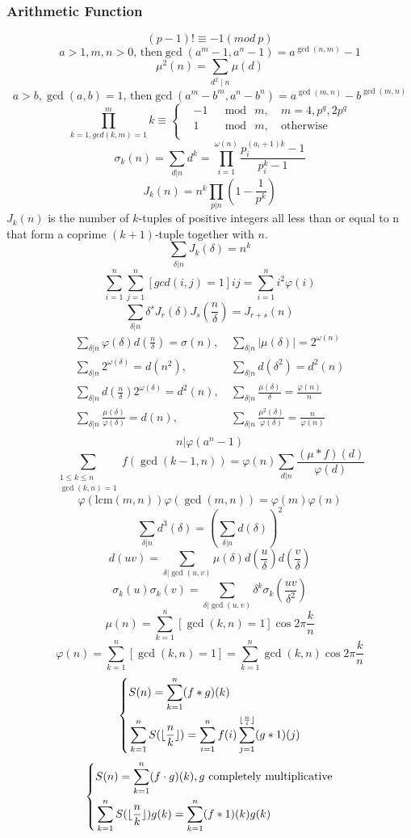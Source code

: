 \begin{small}
\subsubsection{Arithmetic Function}
\[(p-1)!\equiv-1(mod\ p)\]
\[a>1,m,n>0 \text{, then} \gcd(a^m-1,a^n-1)=a^{\gcd(n,m)}-1\]
\[ \mu^2(n) = \sum_{d^2 \mid n} \mu (d) \]
\[a>b,\gcd(a,b)=1 \text{, then} \gcd(a^m-b^m,a^n-b^n)=a^{\gcd(m,n)}-b^{\gcd(m,n)}\]
\[ \prod_{k=1,gcd(k, m) = 1}^{m} k \equiv \left\{
\begin{aligned}
&-1 & \mod\ m,\ & m = 4, p^q, 2p^q \\
&1 & \mod\ m,\ & \text{otherwise} \\
\end{aligned}
\right.
\]
\[ \sigma_k(n) = \sum_{d|n}d^k = \prod_{i=1}^{\omega(n)}\frac{p_i^{(a_i+1)k}-1}
{p_i^k-1} \]
\[ J_k(n) = n^k\prod_{p|n}(1-\frac{1}{p^k}) \]
$J_k(n)$ is the number of $k$-tuples of positive integers all less than or equal to n that form a coprime $(k + 1)$-tuple together with $n$.
\[ \sum_{\delta|n}J_k(\delta) = n^k \]
\[ \sum_{i=1}^{n} \sum_{j=1}^{n} [gcd(i,j)=1]ij =  \sum_{i=1}^{n} i^2\varphi(i) \]
\[ \sum_{\delta|n}\delta^sJ_r(\delta)J_s(\frac{n}{\delta}) = J_{r+s}(n) \]
\begin{align*}
\sum_{\delta|n}\varphi(\delta)d(\frac{n}{\delta}) = \sigma(n),&\ \sum_{\delta|n}\left| \mu(\delta) \right| = 2^{\omega(n)} \\
\sum_{\delta|n}2^{\omega(\delta)} = d(n^2),&\ \sum_{\delta|n}d(\delta^2) = d^2(n) \\
\sum_{\delta|n}d(\frac{n}{\delta})2^{\omega(\delta)} = d^2(n),&\ \sum_{\delta|n}\frac{\mu(\delta)}{\delta} = \frac{\varphi(n)}{n} \\
\sum_{\delta|n}\frac{\mu(\delta)}{\varphi(\delta)} = d(n),&\ \sum_{\delta|n}\frac{\mu^2(\delta)}{\varphi(\delta)} = \frac{n}{\varphi(n)} \\
\end{align*}
\[ n|\varphi(a^n-1) \]
\[ \sum_{\substack{1 \leq k \leq n \\ \gcd(k, n) = 1}}f(\gcd(k-1, n)) = \varphi(n)
\sum_{d|n}\frac{(\mu*f)(d)}{\varphi(d)} \]
\[ \varphi(\mathrm{lcm}(m, n))\varphi(\gcd(m,n)) = \varphi(m)\varphi(n) \]
\[ \sum_{\delta|n}d^3(\delta) = (\sum_{\delta|n}d(\delta))^2 \]
\[ d(uv) = \sum_{\delta|\gcd(u, v)}\mu(\delta)d(\frac{u}{\delta})d(\frac{v}{\delta}) \]
\[ \sigma_k(u)\sigma_k(v) = \sum_{\delta|\gcd(u, v)}\delta^k\sigma_k(\frac{uv}{\delta^2}) \]
\[ \mu(n) = \sum_{k=1}^n[\gcd(k, n)=1]\cos{2\pi \frac{k}{n}} \]
\[ \varphi(n) = \sum_{k=1}^n[\gcd(k, n)=1] = \sum_{k=1}^n\gcd(k, n)\cos{2\pi \frac{k}{n}} \]
\[
\left\{
\begin{aligned}
&S(n) = \sum_{k=1}^n(f \ast g)(k) \\
&\sum_{k=1}^nS(\lfloor {n \over k} \rfloor) = \sum_{i=1}^nf(i)\sum_{j=1}^{\lfloor{n \over i}\rfloor}(g \ast 1)(j)
\end{aligned}
\right.
\]
\[
\left\{
\begin{aligned}
&S(n) = \sum_{k=1}^n(f \cdot g)(k), g \text{ completely multiplicative} \\
&\sum_{k=1}^nS(\lfloor {n \over k} \rfloor)g(k) = \sum_{k=1}^n(f \ast 1)(k)g(k)
\end{aligned}
\right.
\]

\end{small}
